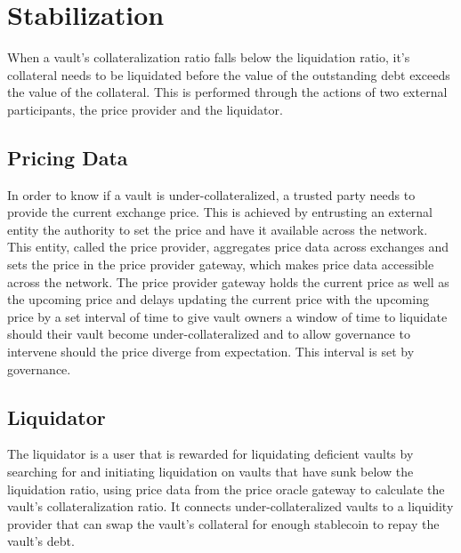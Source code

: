 \documentclass[12pt]{article}
\begin{document}
\section{Stabilization}
When a vault's collateralization ratio falls below the liquidation ratio, it's collateral needs to be liquidated before the value of the outstanding debt exceeds the value of the collateral. This is performed through the actions of two external participants, the price provider and the liquidator.

\subsection{Pricing Data}
In order to know if a vault is under-collateralized, a trusted party needs to provide the current exchange price. This is achieved by entrusting an external entity the authority to set the price and have it available across the network. This entity, called the price provider, aggregates price data across exchanges and sets the price in the price provider gateway, which makes price data accessible across the network. The price provider gateway holds the current price as well as the upcoming price and delays updating the current price with the upcoming price by a set interval of time to give vault owners a window of time to liquidate should their vault become under-collateralized and to allow governance to intervene should the price diverge from expectation. This interval is set by governance.

\subsection{Liquidator}

The liquidator is a user that is rewarded for liquidating deficient vaults by searching for and initiating liquidation on vaults that have sunk below the liquidation ratio, using price data from the price oracle gateway to calculate the vault's collateralization ratio. It connects under-collateralized vaults to a liquidity provider that can swap the vault's collateral for enough stablecoin to repay the vault's debt.
\end{document}
